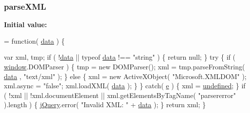 \subsubsection[{parse\+X\+M\+L}]{ parse\+X\+M\+L}\label{jquery-1_810_82-vsdoc_8js_ab58e01f0a789f6062d3b05417f56140e}
{\bfseries Initial value\+:}
\begin{DoxyCode}
= \textcolor{keyword}{function}( \hyperlink{jquery-1_810_82-vsdoc_8js_a609407b3456fdc3c5671a9fc4a226ff7}{data} ) \{


        var xml, tmp;
        \textcolor{keywordflow}{if} ( !\hyperlink{jquery-1_810_82-vsdoc_8js_a609407b3456fdc3c5671a9fc4a226ff7}{data} || typeof \hyperlink{jquery-1_810_82-vsdoc_8js_a609407b3456fdc3c5671a9fc4a226ff7}{data} !== \textcolor{stringliteral}{"string"} ) \{
            \textcolor{keywordflow}{return} null;
        \}
        \textcolor{keywordflow}{try} \{
            \textcolor{keywordflow}{if} ( \hyperlink{jquery-1_810_82-vsdoc_8js_a04a8a2bbfa9c15500892b8e5033d625b}{window}.DOMParser ) \{ 
                tmp = \textcolor{keyword}{new} DOMParser();
                xml = tmp.parseFromString( \hyperlink{jquery-1_810_82-vsdoc_8js_a609407b3456fdc3c5671a9fc4a226ff7}{data} , \textcolor{stringliteral}{"text/xml"} );
            \} \textcolor{keywordflow}{else} \{ 
                xml = \textcolor{keyword}{new} ActiveXObject( \textcolor{stringliteral}{"Microsoft.XMLDOM"} );
                xml.async = \textcolor{stringliteral}{"false"};
                xml.loadXML( \hyperlink{jquery-1_810_82-vsdoc_8js_a609407b3456fdc3c5671a9fc4a226ff7}{data} );
            \}
        \} \textcolor{keywordflow}{catch}( \hyperlink{_bibabook_2_scripts_2jquery-1_810_82_8min_8js_a2c038346d47955cbe2cb91e338edd7e1}{e} ) \{
            xml = \hyperlink{jquery-1_810_82-vsdoc_8js_a08113a236cc18d2a9d5ce27e638012be}{undefined};
        \}
        \textcolor{keywordflow}{if} ( !xml || !xml.documentElement || xml.getElementsByTagName( \textcolor{stringliteral}{"parsererror"} ).length ) \{
            \hyperlink{jquery-1_810_82-vsdoc_8js_add5237586d970a38a81f990e8eb28c6c}{jQuery}.error( \textcolor{stringliteral}{"Invalid XML: "} + \hyperlink{jquery-1_810_82-vsdoc_8js_a609407b3456fdc3c5671a9fc4a226ff7}{data} );
        \}
        \textcolor{keywordflow}{return} xml;
    \}
\end{DoxyCode}
\hypertarget{jquery-1_810_82-vsdoc_8js_a0a2a38b3281bb5c9cf0c479a04b513cb}{}
